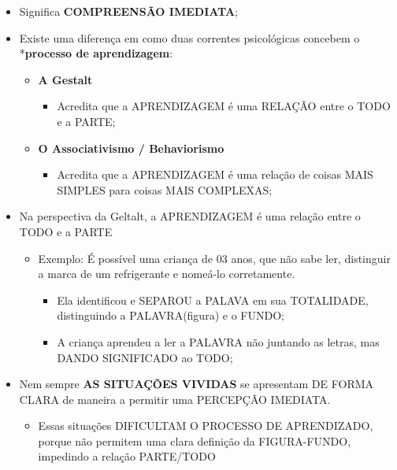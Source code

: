 \documentclass[
]{book}
\providecommand{\tightlist}{%
  \setlength{\itemsep}{0pt}\setlength{\parskip}{0pt}}
\begin{document}
\begin{itemize}
\tightlist
\item
  Significa \textbf{COMPREENSÃO IMEDIATA};
\item
  Existe uma diferença em como duas correntes psicológicas concebem o *\textbf{processo de aprendizagem}:

  \begin{itemize}
  \tightlist
  \item
    \textbf{A Gestalt}

    \begin{itemize}
    \tightlist
    \item
      Acredita que a APRENDIZAGEM é uma RELAÇÃO entre o TODO e a PARTE;
    \end{itemize}
  \item
    \textbf{O Associativismo / Behaviorismo}

    \begin{itemize}
    \tightlist
    \item
      Acredita que a APRENDIZAGEM é uma relação de coisas MAIS SIMPLES para coisas MAIS COMPLEXAS;
    \end{itemize}
  \end{itemize}
\item
  Na perspectiva da Geltalt, a APRENDIZAGEM é uma relação entre o TODO e a PARTE

  \begin{itemize}
  \tightlist
  \item
    Exemplo: É possível uma criança de 03 anos, que não sabe ler, distinguir a marca de um refrigerante e nomeá-lo corretamente.

    \begin{itemize}
    \tightlist
    \item
      Ela identificou e SEPAROU a PALAVA em sua TOTALIDADE, distinguindo a PALAVRA(figura) e o FUNDO;
    \item
      A criança aprendeu a ler a PALAVRA não juntando as letras, mas DANDO SIGNIFICADO ao TODO;
    \end{itemize}
  \end{itemize}
\item
  Nem sempre \textbf{AS SITUAÇÕES VIVIDAS} se apresentam DE FORMA CLARA de maneira a permitir uma PERCEPÇÃO IMEDIATA.

  \begin{itemize}
  \tightlist
  \item
    Essas situações DIFICULTAM O PROCESSO DE APRENDIZADO, porque não permitem uma clara definição da FIGURA-FUNDO, impedindo a relação PARTE/TODO
  \end{itemize}
\end{itemize}
\end{document}
